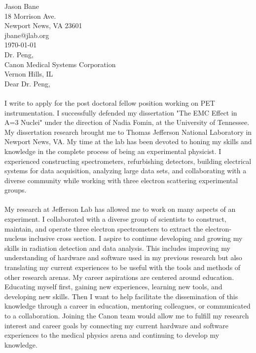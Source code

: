 \documentclass[12pt,letterpaper]{article}
\begin{document}
\vspace*{-1.2cm}
\noindent Jason Bane\\
18 Morrison Ave. \\
Newport News, VA 23601 \\
jbane@jlab.org \\
\today\\

\noindent Dr. Peng,\\
Canon Medical Systems Corporation\\
Vernon Hills, IL\\




Dear Dr. Peng, 

\paragraph{}I write to apply for the post doctoral fellow position working on PET instrumentation. I successfully defended my dissertation "The EMC Effect in A=3 Nuclei" under the direction of Nadia Fomin, at the University of Tennessee. My dissertation research brought me to Thomas Jefferson National Laboratory in Newport News, VA. My time at the lab has been devoted to honing my skills and knowledge in the complete process of being an experimental physicist. I experienced constructing spectrometers, refurbishing detectors, building electrical systems for data acquisition, analyzing large data sets, and collaborating with a diverse community while working with three electron scattering experimental groups.
\paragraph{}My research at Jefferson Lab has allowed me to work on many aspects of an experiment. I collaborated with a diverse group of scientists to construct, maintain, and operate three electron spectrometers to extract the electron-nucleus inclusive cross section. I aspire to continue developing and growing my skills in radiation detection and data analysis. This includes improving my understanding of hardware and software used in my previous research but also translating my current experiences to be useful with the tools and methods of other research arenas. My career aspirations are centered around education. Educating myself first, gaining new experiences, learning new tools, and developing new skills. Then I want to help facilitate the dissemination of this knowledge through a career in education, mentoring colleagues, or communicated to a collaboration.  Joining the Canon team would allow me to fulfill my research interest and career goals by connecting my current hardware and software experiences to the medical physics arena and continuing to develop my knowledge.
\end{document}
